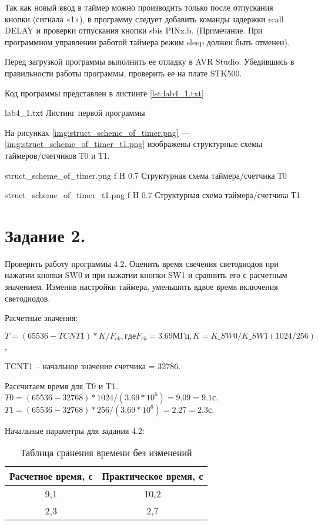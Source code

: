 \documentclass{bmstu}
\begin{document}
Так как новый ввод в таймер можно производить только после отпускания кнопки (сигнала «1»), в программу следует 
добавить команды задержки rcall DELAY и проверки отпускания кнопки sbis PINx,b. (Примечание. При программном 
управлении работой таймера режим sleep должен быть отменен). 

Перед загрузкой программы выполнить ее отладку в AVR Studio. Убедившись в правильности работы программы, проверить 
ее на плате STK500. 

Код программы представлен в листинге \ref{lst:lab4_1.txt}

	{lab4_1.txt}
	{Листинг первой программы}

На рисунках \ref{img:struct_scheme_of_timer.png} --- \ref{img:struct_scheme_of_timer_t1.png} изображены структурные схемы таймеров/счетчиков Т0 и Т1.

	{struct_scheme_of_timer.png}
	{f}
	{H}
	{0.7\textwidth}
	{Структурная схема таймера/счетчика Т0}

	{struct_scheme_of_timer_t1.png}
	{f}
	{H}
	{0.7\textwidth}
	{Структурная схема таймера/счетчика Т1}

\chapter{Задание 2.}

Проверить работу программы 4.2. Оценить время свечения светодиодов при нажатии кнопки SW0 и при нажатии кнопки SW1 и сравнить его с расчетным значением. Изменив настройки таймера, уменьшить вдвое время включения светодиодов.
 
Расчетные значения:

$T = (65536 - TCNT1) * K / F_{ck}, где F_{ck} = 3.69МГц, K = K\_SW0/K\_SW1(1024/256)$,

TCNT1 – начальное значение счетчика = 32786.

Рассчитаем время для T0 и T1. \\
$T0 = (65536 - 32 768) * 1024 / (3.69 * 10^6) = 9.09 = 9.1с. $ \\
$T1 = (65536 - 32 768) * 256 / (3.69 * 10^6) = 2.27 = 2.3с. $

Начальные параметры для задания 4.2:

\begin{table}[H]
\caption{Таблица сранения времени без изменений}
\label{table:eq_table_1}
\begin{tabular}{| c | c |}
	\hline
		Расчетное время, с & Практическое время, с \\
	\hline
		9,1 & 10,2 \\
	\hline
		2,3 & 2,7 \\
	\hline
\end{tabular}
\end{table}
\end{document}
